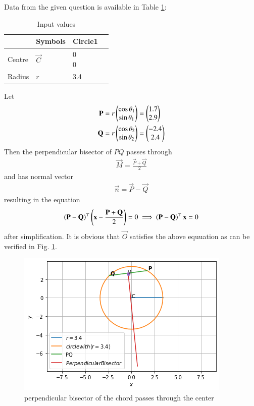 Data from the given question is available in Table \ref{constr/circ/61/tab:table1}:
%
\begin{table}[!ht]
\begin{center}
\begin{tabular}{ | m{2cm} | m{1.5cm}| m{2cm} | m{1.5cm} |} 
\hline
& Symbols & Circle1  \\
\hline
Centre & $\vec{C}$ & \myvec{0\\0}  \\ 
\hline
Radius & $r$& 3.4 \\ 
\hline
\end{tabular}
\end{center}
\caption{Input values}
\label{constr/circ/61/tab:table1}
\end{table}
%
Let 
\begin{align}
      \mathbf{P} &= r \begin{pmatrix}\cos \theta_1\\ \sin \theta_1\end{pmatrix} =  \begin{pmatrix}1.7\\2.9\end{pmatrix}
      \\
      \mathbf{Q} &= r \begin{pmatrix}\cos \theta_2\\ \sin \theta_2\end{pmatrix} =\begin{pmatrix}-2.4\\2.4\end{pmatrix}
 \end{align}
 Then the perpendicular bisector of $PQ$ passes through 
 \begin{align}
    \vec{M} = \frac{\vec{P}+\vec{Q}}{2} 
\end{align}
and has normal vector 
\begin{align}
    \vec{n} = \vec{P}-\vec{Q}
\end{align}
resulting in the equation
\begin{align}
    \left(\mathbf{P}-\mathbf{Q}\right)^\top\left(\mathbf{x}-\frac{\mathbf{P}+\mathbf{Q}}{2} \right) = 0
    \implies \left(\mathbf{P}-\mathbf{Q}\right)^\top\mathbf{x} = 0
\end{align}
%
after simplification.  It is obvious that $\vec{O}$ satisfies the above equuation as can be verified in Fig.     \ref{constr/circ/61/fig: perpenicular bisector of the chord passes through the center}.
%
\begin{figure}[ht]
    \centering
    \includegraphics[width=\columnwidth]{solutions/circle/61/FIG.3.png}
    \caption{perpendicular bisector of the chord passes through the center}
    \label{constr/circ/61/fig: perpenicular bisector of the chord passes through the center}
\end{figure}






